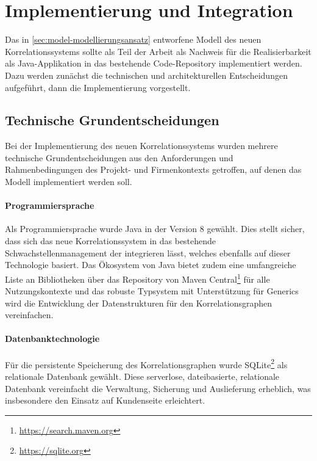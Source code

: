 \section{Implementierung und Integration}\label{sec:implementierung}

Das in \autoref{sec:model-modellierungsansatz} entworfene Modell des neuen Korrelationssystems sollte als Teil der Arbeit als Nachweis für die Realisierbarkeit als Java-Applikation in das bestehende Code-Repository implementiert werden.
Dazu werden zunächst die technischen und architekturellen Entscheidungen aufgeführt, dann die Implementierung vorgestellt.

\subsection{Technische Grundentscheidungen}\label{subsec:impl-tech-choices}

Bei der Implementierung des neuen Korrelationssystems wurden mehrere technische Grundentscheidungen aus den Anforderungen und Rahmenbedingungen des Projekt- und Firmenkontexts getroffen, auf denen das Modell implementiert werden soll.

\paragraph{Programmiersprache}

Als Programmiersprache wurde Java in der Version 8 gewählt.
Dies stellt sicher, dass sich das neue Korrelationssystem in das bestehende Schwachstellenmanagement der \metaeffektsp integrieren lässt, welches ebenfalls auf dieser Technologie basiert.
Das Ökosystem von Java bietet zudem eine umfangreiche Liste an Bibliotheken über das Repository von Maven Central\footnote{\url{https://search.maven.org}} für alle Nutzungskontexte und das robuste Typsystem mit Unterstützung für Generics wird die Entwicklung der Datenstrukturen für den Korrelationsgraphen vereinfachen.

\paragraph{Datenbanktechnologie}

Für die persistente Speicherung des Korrelationsgraphen wurde SQLite\footnote{\url{https://sqlite.org}} als relationale Datenbank gewählt.
Diese serverlose, dateibasierte, relationale Datenbank vereinfacht die Verwaltung, Sicherung und Auslieferung erheblich, was insbesondere den Einsatz auf Kundenseite erleichtert.

